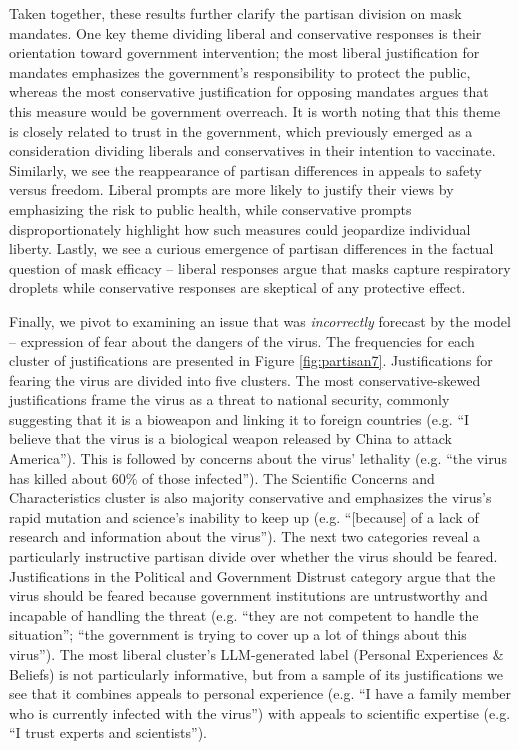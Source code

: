 \documentclass{article}
\begin{document}
Taken together, these results further clarify the partisan division on mask mandates. One key
theme dividing liberal and conservative responses is their orientation toward government
intervention; the most liberal justification for mandates emphasizes the government's responsibility
to protect the public, whereas the most conservative justification for opposing mandates argues that
this measure would be government overreach. It is worth noting that this theme is closely related to
trust in the government, which previously emerged as a consideration dividing liberals and
conservatives in their intention to vaccinate. Similarly, we see the reappearance of partisan
differences in appeals to safety versus freedom. Liberal prompts are more likely to justify
their views by emphasizing the risk to public health, while conservative prompts disproportionately
highlight how such measures could jeopardize individual liberty. Lastly, we see a curious emergence
of partisan differences in the factual question of mask efficacy -- liberal responses argue that
masks capture respiratory droplets while conservative responses are skeptical of any protective effect.

Finally, we pivot to examining an issue that was \emph{incorrectly}
forecast by the model -- expression of fear about the dangers of the
virus. The frequencies for each cluster of justifications are presented
in Figure \ref{fig:partisan7}. Justifications for fearing the virus are divided into five
clusters. The most conservative-skewed justifications frame the virus as
a threat to national security, commonly suggesting that it is a
bioweapon and linking it to foreign countries (e.g. ``I believe that the
virus is a biological weapon released by China to attack America'').
This is followed by concerns about the virus' lethality (e.g. ``the
virus has killed about 60\% of those infected''). The Scientific
Concerns and Characteristics cluster is also majority conservative and
emphasizes the virus's rapid mutation and science's inability to keep up
(e.g. ``{[}because{]} of a lack of research and information about the
virus''). The next two categories reveal a particularly instructive
partisan divide over whether the virus should be feared. Justifications
in the Political and Government Distrust category argue that the virus
should be feared because government institutions are untrustworthy and
incapable of handling the threat (e.g. ``they are not competent to
handle the situation''; ``the government is trying to cover up a lot of
things about this virus''). The most liberal cluster's LLM-generated
label (Personal Experiences \& Beliefs) is not particularly informative,
but from a sample of its justifications we see that it combines appeals
to personal experience (e.g. ``I have a family member who is currently
infected with the virus'') with appeals to scientific expertise (e.g.
``I trust experts and scientists'').
\end{document}
